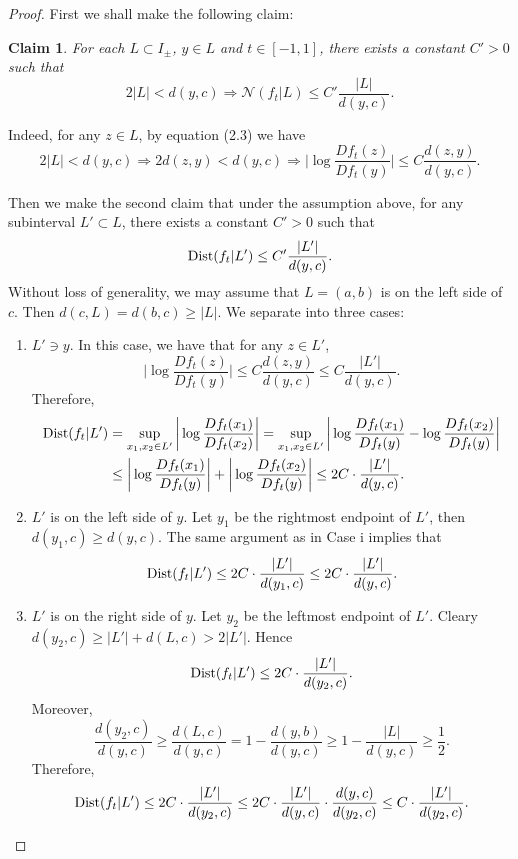 \documentclass[11pt,oneside]{article}
\newtheorem*{claim}{Claim}
\theoremstyle{plain}
\numberwithin{equation}{section}
\numberwithin{figure}{section}
\numberwithin{table}{section}
\begin{document}
\iffalse
\begin{proof}

\iffalse

First we shall make the following claim:

\begin{claim}
For each $L \subset  I_{\pm}$, $y \in L$ and $t \in [-1, 1]$, there exists a constant $C' >0$ such that 
\[
2 |L| < d(y, c) \Longrightarrow \mathcal N(f_t|L) \leq C' \frac{|L|}{d (y, c)}. 
\]
\end{claim}


Indeed, for any $z \in L$, by equation (2.3) we have
\[
2 |L| < d(y, c) \Rightarrow  2 d(z, y) < d(y, c) \Rightarrow \bigg| \log \frac{Df_t(z)}{Df_t(y)} \bigg| \leq C \frac{d(z, y)}{d(y, c)}.
\]


Then we make the second claim that under the assumption above, for any subinterval $L' \subset L$, there exists a constant $C'>0$ such that
\[
{\rm Dist}(f_t|L') \leq C' \frac{|L'|}{d(y, c)}.
\]
Without loss of generality, we may assume that $L = (a, b)$ is on the left side of $c$. Then $d(c, L) = d(b, c) \geq |L|$. We separate into three cases:

\begin{enumerate}

\item[Case i] $L' \ni y$. In this case, we have that for any $z \in L'$, 
\[
\bigg| \log \frac{Df_t(z)}{Df_t(y)} \bigg| \leq C \frac{d(z, y)}{d(y, c)} \leq C \frac{|L'|}{d(y, c)}.
\]
Therefore, 
\begin{align*}
{\rm Dist}(f_t|L') &= \sup_{x_1, x_2 \in L'} \bigg| \log \frac{Df_t(x_1)}{Df_t(x_2)} \bigg| =\sup_{x_1, x_2 \in L'} \bigg| \log \frac{Df_t(x_1)}{Df_t(y)} - \log \frac{Df_t(x_2)}{Df_t(y)} \bigg|\\
&\leq \bigg| \log \frac{Df_t(x_1)}{Df_t(y)} \bigg| + \bigg| \log \frac{Df_t(x_2)}{Df_t(y)} \bigg| \leq 2C \cdot \frac{|L'|}{d(y, c)}.
\end{align*}


\item[Case ii] $L'$ is on the left side of $y$. Let $y_1$ be the rightmost endpoint of $L'$, then $d(y_1, c) \geq d(y, c)$. The same argument as in Case i implies that
\[
{\rm Dist}(f_t|L') \leq   2 C \cdot \frac{|L'|}{d(y_1, c)} \leq  2C \cdot \frac{|L'|}{d(y, c)}.
\]

\item[Case iii] $L'$ is on the right side of $y$. Let $y_2$ be the leftmost endpoint of $L'$. Cleary $d(y_2, c) \geq |L'| + d(L, c) > 2 |L'|$. Hence 
\[
{\rm Dist}(f_t|L') \leq   2C \cdot \frac{|L'|}{d(y_2, c)}.
\]
Moreover, 
\[
\frac{d(y_2, c)}{d(y, c)} \geq \frac{d(L, c)}{d(y, c)} = 1 - \frac{d(y, b)}{d(y, c)} \geq 1 - \frac{|L|}{d(y, c)} \geq \frac{1}{2}.
\]
Therefore,
\[
{\rm Dist}(f_t|L') \leq 2C \cdot \frac{|L'|}{d(y_2, c)} \leq  2C \cdot \frac{|L'|}{d(y, c)} \cdot \frac{d(y, c)}{d(y_2, c)} \leq C \cdot  \frac{|L'|}{d(y_2, c)}.
\]


\end{enumerate}
\end{proof}
\end{document}
